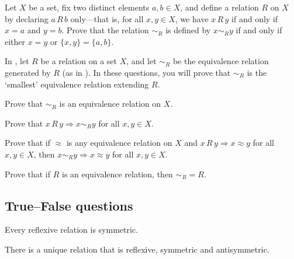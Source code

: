 \begin{chapex}
\label{cqEquivalenceRelationGeneratedByRelationEnd}
Let $X$ be a set, fix two distinct elements $a,b \in X$, and define a relation $R$ on $X$ by declaring $a\,R\,b$ only---that is, for all $x,y \in X$, we have $x\,R\,y$ if and only if $x=a$ and $y=b$. Prove that the relation ${\sim}_R$ is defined by $x \sim_R y$ if and only if either $x=y$ or $\{x,y\} = \{a,b\}$.
\end{chapex}

In , let $R$ be a relation on a set $X$, and let $\sim_R$ be the equivalence relation generated by $R$ (as in ). In these questions, you will prove that $\sim_R$ is the `smallest' equivalence relation extending $R$.

\begin{chapex}
\label{cqPropertiesOfEquivalenceRelationGeneratedByRelationBegin}
Prove that ${\sim}_R$ is an equivalence relation on $X$.
\end{chapex}

\begin{chapex}
Prove that $x\,R\,y \Rightarrow x \sim_R y$ for all $x,y \in X$.
\end{chapex}

\begin{chapex}
Prove that if $\approx$ is any equivalence relation on $X$ and $x\,R\,y \Rightarrow x \approx y$ for all $x,y \in X$, then $x \sim_R y \Rightarrow x \approx y$ for all $x,y \in X$.
\end{chapex}

\begin{chapex}
\label{cqPropertiesOfEquivalenceRelationGeneratedByRelationEnd}
Prove that if $R$ is an equivalence relation, then ${\sim_R} = R$.
\end{chapex}

\subsection*{True--False questions}


\begin{chapex} %
\label{cqRelationsTFBegin}
Every reflexive relation is symmetric.
\end{chapex}

\begin{chapex} %
There is a unique relation that is reflexive, symmetric and antisymmetric.
\end{chapex}

